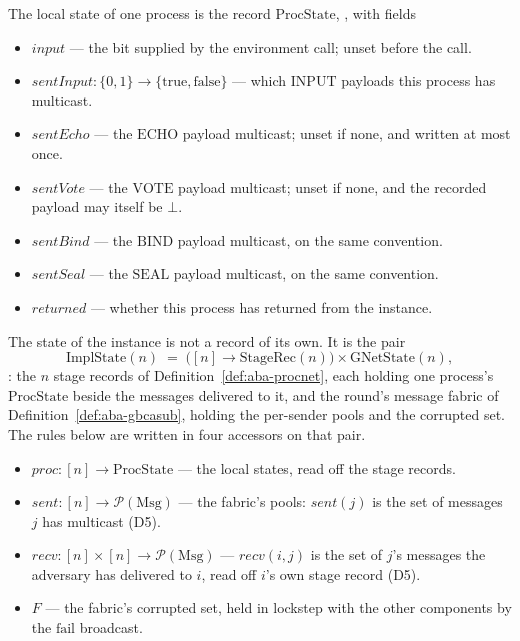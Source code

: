 The local state of one process is the record $\mathrm{ProcState}$, , with fields
\begin{itemize}
  \item $\mathit{input}$ --- the bit supplied by the environment call; unset
    before the call.
  \item $\mathit{sentInput} : \{0,1\} \to \{\text{true},\text{false}\}$ --- which
    $\mathrm{INPUT}$ payloads this process has multicast.
  \item $\mathit{sentEcho}$ --- the $\mathrm{ECHO}$ payload multicast; unset if
    none, and written at most once.
  \item $\mathit{sentVote}$ --- the $\mathrm{VOTE}$ payload multicast; unset if
    none, and the recorded payload may itself be $\bot$.
  \item $\mathit{sentBind}$ --- the $\mathrm{BIND}$ payload multicast, on the
    same convention.
  \item $\mathit{sentSeal}$ --- the $\mathrm{SEAL}$ payload multicast, on the
    same convention.
  \item $\mathit{returned}$ --- whether this process has returned from the
    instance.
\end{itemize}
The state of the instance is not a record of its own.
It is the pair
\[
  \mathrm{ImplState}(n) \;=\;
    \bigl([n] \to \mathrm{StageRec}(n)\bigr) \times \mathrm{GNetState}(n),
\]
: the $n$ stage records of
Definition~\ref{def:aba-procnet}, each holding one process's $\mathrm{ProcState}$
beside the messages delivered to it, and the round's message fabric of
Definition~\ref{def:aba-gbcasub}, holding the per-sender pools and the corrupted
set.
The rules below are written in four accessors on that pair.
\begin{itemize}
  \item $\mathit{proc} : [n] \to \mathrm{ProcState}$ --- the local states, read
    off the stage records.
  \item $\mathit{sent} : [n] \to \mathcal{P}(\mathrm{Msg})$ --- the fabric's
    pools: $\mathit{sent}(j)$ is the set of messages $j$ has multicast (D5).
  \item $\mathit{recv} : [n] \times [n] \to \mathcal{P}(\mathrm{Msg})$ ---
    $\mathit{recv}(i,j)$ is the set of $j$'s messages the adversary has delivered
    to $i$, read off $i$'s own stage record (D5).
  \item $F$ --- the fabric's corrupted set, held in lockstep with the other
    components by the $\mathrm{fail}$ broadcast.
\end{itemize}
